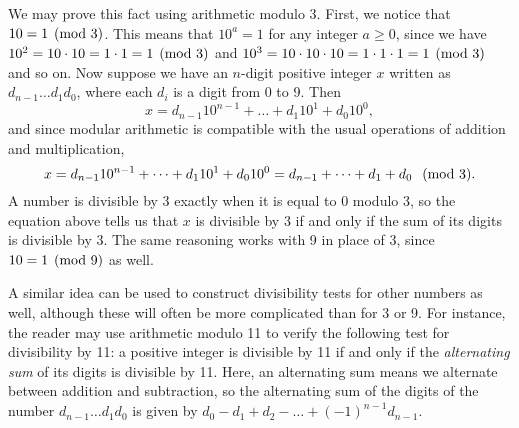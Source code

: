 We may prove this fact using arithmetic modulo 3.
First, we notice that $10 = 1 \hspace{.15cm} \text{(mod 3)}$.
This means that $10^a = 1$ for any integer $a \geq 0$, since we have $10^2 = 10 \cdot 10 = 1 \cdot 1 = 1 \hspace{.15cm} \text{(mod 3)}$ and $10^3 = 10 \cdot 10 \cdot 10 = 1 \cdot 1 \cdot 1 = 1 \hspace{.15cm} \text{(mod 3)}$ and so on.
Now suppose we have an $n$-digit positive integer $x$ written as $d_{n-1} \dots d_1 d_0$, where each $d_i$ is a digit from 0 to 9.
Then
\[x = d_{n-1}10^{n-1} + \dots + d_1 10^1 + d_0 10^0,\]
and since modular arithmetic is compatible with the usual operations of addition and multiplication,
\[x = d_{n-1}10^{n-1} + \dots + d_1 10^1 + d_0 10^0 = d_{n-1}+ \dots + d_1  + d_0 \hspace{.25cm} \text{(mod 3)}.\]
A number is divisible by 3 exactly when it is equal to 0 modulo 3, so the equation above tells us that $x$ is divisible by 3 if and only if the sum of its digits is divisible by 3.
The same reasoning works with 9 in place of 3, since $10 = 1\hspace{.15cm} \text{(mod 9)}$ as well.

A similar idea can be used to construct divisibility tests for other numbers as well, although these will often be more complicated than for 3 or 9.
For instance, the reader may use arithmetic modulo 11 to verify the following test for divisibility by 11: a positive integer is divisible by 11 if and only if the \textit{alternating sum} of its digits is divisible by 11.
Here, an alternating sum means we alternate between addition and subtraction, so the alternating sum of the digits of the number $d_{n-1} \dots d_1 d_0$ is given by $d_0 - d_1 + d_2 - \dots + (-1)^{n-1} d_{n-1}$.
